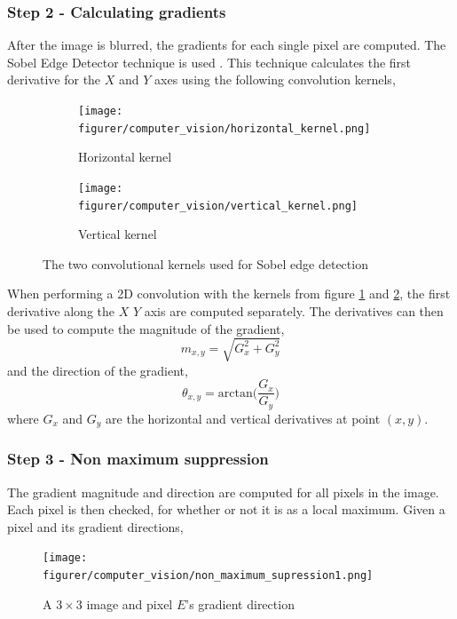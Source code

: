 \documentclass[11pt]{article}
\begin{document}
\subsubsection*{Step 2 - Calculating gradients}

After the image is blurred, the gradients for each single pixel are computed. The Sobel Edge Detector technique is used \cite{sobel_edge_detector}. This technique calculates the first derivative for the $X$ and $Y$ axes using the following convolution kernels,
\newpage
\begin{figure}[!h]
     \centering
     \begin{subfigure}[b]{0.22\textwidth}
         \centering
         \texttt{[image: figurer/computer\_vision/horizontal\_kernel.png]}
         \caption{Horizontal kernel}
         \label{fig:computer_vision_kernel1}
     \end{subfigure}
     \hspace{2cm}
     \begin{subfigure}[b]{0.22\textwidth}
         \centering
         \texttt{[image: figurer/computer\_vision/vertical\_kernel.png]}
         \caption{Vertical kernel}
         \label{fig:computer_vision_kernel2}
     \end{subfigure}
     \caption{The two convolutional kernels used for Sobel edge detection}
     \label{fig:computer_vision_sobel_kernels}
\end{figure}

When performing a 2D convolution with the kernels from figure \ref{fig:computer_vision_kernel1} and \ref{fig:computer_vision_kernel2}, the first derivative along the $X$ $Y$ axis are computed separately. The derivatives can then be used to compute the magnitude of the gradient,
\begin{equation}
    m_{x, y} = \sqrt{G_{x}^{2} + G_{y}^{2}}
\end{equation}
and the direction of the gradient,
\begin{equation}
    \theta_{x, y} = \text{arctan}\Big(\frac{G_{x}}{G_{y}}\Big)
\end{equation}
where $G_{x}$ and $G_{y}$ are the horizontal and vertical derivatives at point $(x, y)$.

\subsubsection*{Step 3 - Non maximum suppression}

The gradient magnitude and direction are computed for all pixels in the image. Each pixel is then checked, for whether or not it is as a local maximum. Given a pixel and its gradient directions,
\begin{figure}[!h]
    \centering
    \texttt{[image: figurer/computer\_vision/non\_maximum\_supression1.png]}
    \caption{A $3 \times 3$ image and pixel $E$'s gradient direction}
    \label{fig:computer_vision_non_max_1}
\end{figure}
\end{document}
